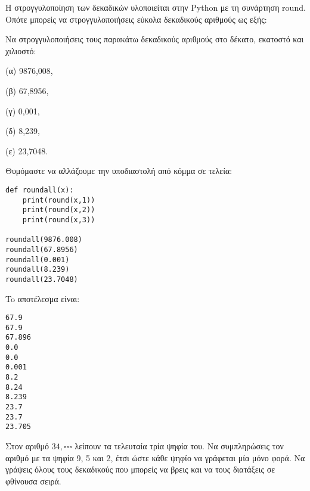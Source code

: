 Η στρογγυλοποίηση των δεκαδικών υλοποιείται στην Python με τη συνάρτηση round. Οπότε μπορείς να στρογγυλοποιήσεις εύκολα δεκαδικούς αριθμούς ως εξής:
\begin{exercise}
Να στρογγυλοποιήσεις τους παρακάτω δεκαδικούς αριθμούς στο δέκατο, εκατοστό και
χιλιοστό: 

(α) 9876,008, 

(β) 67,8956, 

(γ) 0,001, 

(δ) 8,239, 

(ε) 23,7048.
\end{exercise}
Θυμόμαστε να αλλάζουμε την υποδιαστολή από κόμμα σε τελεία:
\begin{lstlisting}
def roundall(x):
    print(round(x,1))
    print(round(x,2))
    print(round(x,3))

roundall(9876.008)
roundall(67.8956)
roundall(0.001)
roundall(8.239)
roundall(23.7048)
\end{lstlisting}

To αποτέλεσμα είναι:
\begin{lstlisting}
67.9
67.9
67.896
0.0
0.0
0.001
8.2
8.24
8.239
23.7
23.7
23.705
\end{lstlisting}

\begin{exercise}
 Στον αριθμό $34,\square\square\square$ λείπουν τα τελευταία τρία ψηφία του. Να συμπληρώσεις τον
αριθμό με τα ψηφία 9, 5 και 2, έτσι ώστε κάθε ψηφίο να γράφεται μία μόνο φορά. Να γράψεις όλους τους δεκαδικούς που μπορείς να βρεις και να τους διατάξεις σε φθίνουσα σειρά.
\end{exercise}

